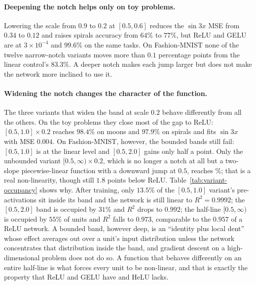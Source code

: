 \documentclass[11pt]{article}
\begin{document}
{\paragraph{Deepening the notch helps only on toy problems.} Lowering the scale from $0.9$ to $0.2$ at
$[0.5,0.6]$ reduces the $\sin 3x$ MSE from $0.34$ to $0.12$ and raises spirals accuracy from $64\%$ to
$77\%$, but ReLU and GELU are at $3\times10^{-4}$ and $99.6\%$ on the same tasks. On Fashion-MNIST none
of the twelve narrow-notch variants moves more than $0.1$ percentage points from the linear control's
$83.3\%$. A deeper notch makes each jump larger but does not make the network more inclined to use it.

\paragraph{Widening the notch changes the character of the function.} The three variants that widen the
band at scale $0.2$ behave differently from all the others. On the toy problems they close most of the
gap to ReLU: $[0.5,1.0]\times0.2$ reaches $98.4\%$ on moons and $97.9\%$ on spirals and fits $\sin 3x$
with MSE $0.004$. On Fashion-MNIST, however, the bounded bands still fail: $[0.5,1.0]$ is at the linear
level and $[0.5,2.0]$ gains only half a point. Only the unbounded variant $[0.5,\infty)\times0.2$, which
is no longer a notch at all but a two-slope piecewise-linear function with a downward jump at $0.5$,
reaches \bestVariantFashionAcc\%; that is a real non-linearity, though still $1.8$ points below ReLU.
Table~\ref{tab:variant-occupancy} shows why. After training, only $13.5\%$ of the $[0.5,1.0]$ variant's
pre-activations sit inside its band and the network is still linear to $R^2=0.9992$; the $[0.5,2.0]$
band is occupied by $31\%$ and $R^2$ drops to $0.992$; the half-line $[0.5,\infty)$ is occupied by
$55\%$ of units and $R^2$ falls to $0.973$, comparable to the $0.957$ of a ReLU network. A bounded
band, however deep, is an ``identity plus local dent'' whose effect averages out over a unit's input
distribution unless the network concentrates that distribution inside the band, and gradient descent
on a high-dimensional problem does not do so. A function that behaves differently on an entire half-line
is what forces every unit to be non-linear, and that is exactly the property that ReLU and GELU have
and HeLU lacks.

}
\end{document}
